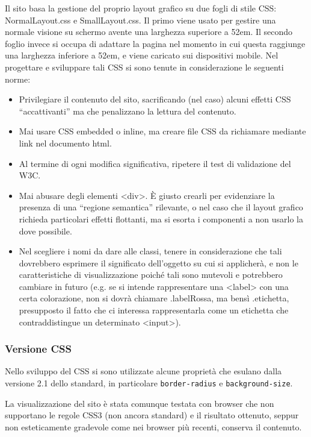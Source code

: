 \documentclass[10pt,a4paper,onecolumn]{article}
\begin{document}
Il sito basa la gestione del proprio layout grafico su due fogli di stile CSS: NormalLayout.css e SmallLayout.css. Il primo viene usato per gestire una normale visione su schermo avente una larghezza superiore a 52em. Il secondo foglio invece si occupa di adattare la pagina nel momento in cui questa raggiunge una larghezza inferiore a 52em, e viene caricato sui dispositivi mobile. Nel progettare e sviluppare tali CSS si sono tenute in considerazione le seguenti norme:

\begin{itemize}
  \item Privilegiare il contenuto del sito, sacrificando (nel caso) alcuni effetti CSS ``accattivanti'' ma che penalizzano la lettura del contenuto.
  \item Mai usare CSS embedded o inline, ma creare file CSS da richiamare mediante link nel documento html.
  \item Al termine di ogni modifica significativa, ripetere il test di validazione del W3C.
  \item Mai abusare degli elementi <div>. È giusto crearli per evidenziare la presenza di una ``regione semantica'' rilevante, o nel caso che il layout grafico richieda particolari effetti flottanti, ma si esorta i componenti a non usarlo la dove possibile.
  \item Nel scegliere i nomi da dare alle classi, tenere in considerazione che tali dovrebbero esprimere il significato dell'oggetto su cui si applicherà, e non le caratteristiche di visualizzazione poiché tali sono mutevoli e potrebbero cambiare in futuro (e.g. se si intende rappresentare una <label> con una certa colorazione, non si dovrà chiamare .labelRossa, ma bensì .etichetta, presupposto il fatto che ci interessa rappresentarla come un etichetta che contraddistingue un determinato <input>).
\end{itemize}

\subsubsection{Versione CSS}
Nello sviluppo del CSS si sono utilizzate alcune proprietà che esulano dalla versione 2.1 dello standard, in particolare \verb+border-radius+ e \verb+background-size+.

La visualizzazione del sito è stata comunque testata con browser che non supportano le regole CSS3 (non ancora standard) e il risultato ottenuto, seppur non esteticamente gradevole come nei browser più recenti, conserva il contenuto.
\end{document}
